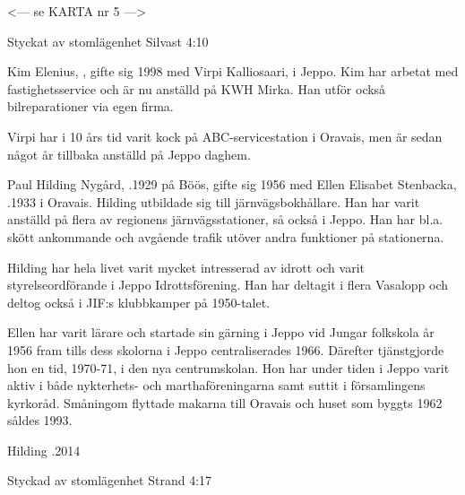 
<--- se KARTA nr 5 --->



Styckat av stomlägenhet Silvast 4:10


Kim Elenius, , gifte sig 1998 med Virpi Kalliosaari,  i Jeppo. Kim har arbetat med fastighetsservice och är nu anställd på KWH Mirka. Han utför också bilreparationer via egen firma.

Virpi har i 10 års tid varit kock på ABC-servicestation i Oravais, men är sedan något år tillbaka anställd på Jeppo daghem.
\begin{jhchildren}
  \item {}
  \item {}
\end{jhchildren}


Paul Hilding Nygård, .1929 på Böös, gifte sig 1956 med Ellen Elisabet Stenbacka, .1933 i Oravais. Hilding utbildade sig till järnvägsbokhållare. Han har varit anställd på flera av regionens järnvägsstationer, så också i Jeppo. Han har bl.a. skött ankommande och avgående trafik utöver andra  funktioner på stationerna.

Hilding har hela livet varit mycket intresserad av idrott och varit styrelseordförande i Jeppo Idrottsförening. Han har deltagit i flera Vasalopp och deltog också i JIF:s klubbkamper på 1950-talet.

Ellen har varit lärare och startade sin gärning i Jeppo vid Jungar folkskola år 1956 fram tills dess skolorna i Jeppo centraliserades 1966. Därefter tjänstgjorde hon en tid, 1970-71, i den nya centrumskolan. Hon har under tiden i Jeppo varit aktiv i både nykterhets- och marthaföreningarna samt suttit i församlingens kyrkoråd. Småningom flyttade makarna till Oravais och huset som byggts 1962 såldes 1993.

Hilding .2014




Styckad av stomlägenhet Strand 4:17


